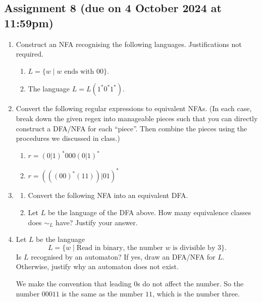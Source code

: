 \documentclass{amsart}
\begin{document}
\subsection{Assignment 8  (due on 4 October 2024 at 11:59pm)}
\label{sec:orga0fc52e}
\toggletrue{solutions}

\begin{enumerate}
\item Construct an NFA recognising the following languages. Justifications not required.
\begin{enumerate}
\item \(L = \{w \mid w\text{ ends with }00\}\).
\item The language \(L = L(1^*0^*1^*)\).
\end{enumerate}

\item Convert the following regular expressions to equivalent NFAs.
(In each case, break down the given regex into manageable pieces such that you can directly construct a DFA/NFA for each ``piece''.
Then combine the pieces using the procedures we discussed in class.)
\begin{enumerate}
\item \(r = (0|1)^*000(0|1)^*\)
\item \(r = (((00)^*(11))|01)^*\)
\end{enumerate}

\item \begin{enumerate}
\item Convert the following NFA into an equivalent DFA.
  \begin{center}
\end{center}

\item Let \(L\) be the language of the DFA above.
How many equivalence classes does \(\sim_L\) have?
Justify your answer.
\end{enumerate}

\item Let \(L\) be the language
\[ L = \{w \mid \text{Read in binary, the number } w \text{ is divisible by 3}\}.\]
Is \(L\) recognised by an automaton?
If yes, draw an DFA/NFA for \(L\).
Otherwise, justify why an automaton does not exist.

We make the convention that leading \(0\)s do not affect the number.
So the number \(00011\) is the same as the number \(11\), which is the number three.
\end{enumerate}
\end{document}
